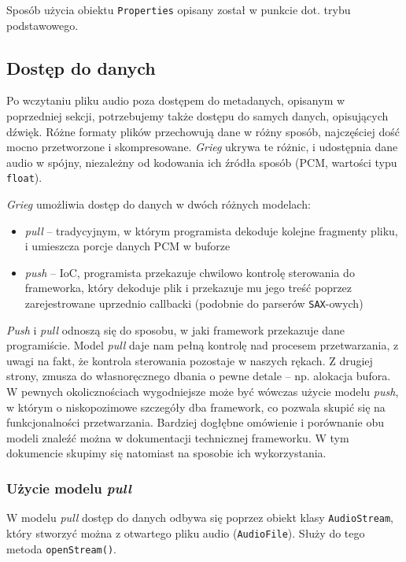 Sposób użycia obiektu \texttt{Properties} opisany został w punkcie dot. trybu podstawowego.

\subsection{Dostęp do danych}

Po wczytaniu pliku audio poza dostępem do metadanych, opisanym w poprzedniej sekcji, potrzebujemy
także dostępu do samych danych, opisujących dźwięk. Różne formaty plików przechowują dane w różny
sposób, najczęściej dość mocno przetworzone i skompresowane. \emph{Grieg} ukrywa te różnic, i
udostępnia dane audio w spójny, niezależny od kodowania ich źródła sposób (PCM, wartości typu
\texttt{float}).

\emph{Grieg} umożliwia dostęp do danych w dwóch różnych modelach:

\begin{itemize}
  \item \emph{pull} -- tradycyjnym, w którym programista dekoduje kolejne fragmenty pliku, i
    umieszcza porcje danych PCM w buforze

  \item \emph{push} -- IoC, programista przekazuje chwilowo kontrolę sterowania do frameworka, który
    dekoduje plik i przekazuje mu jego treść poprzez zarejestrowane uprzednio callbacki (podobnie do
    parserów \texttt{SAX}-owych)
\end{itemize}

\emph{Push} i \emph{pull} odnoszą się do sposobu, w jaki framework przekazuje dane programiście.
Model \emph{pull} daje nam pełną kontrolę nad procesem przetwarzania, z uwagi na fakt, że kontrola
sterowania pozostaje w naszych rękach. Z drugiej strony, zmusza do własnoręcznego dbania o pewne
detale -- np.  alokacja bufora. W pewnych okolicznościach wygodniejsze może być wówczas użycie
modelu \emph{push}, w którym o niskopozimowe szczegóły dba framework, co pozwala skupić się na
funkcjonalności przetwarzania. Bardziej dogłębne omówienie i porównanie obu modeli znaleźć można w
dokumentacji technicznej frameworku. W tym dokumencie skupimy się natomiast na sposobie ich
wykorzystania.

\subsubsection{Użycie modelu \emph{pull}}

W modelu \emph{pull} dostęp do danych odbywa się poprzez obiekt klasy \texttt{AudioStream}, który
stworzyć można z otwartego pliku audio (\texttt{AudioFile}). Służy do tego metoda
\texttt{openStream()}.

